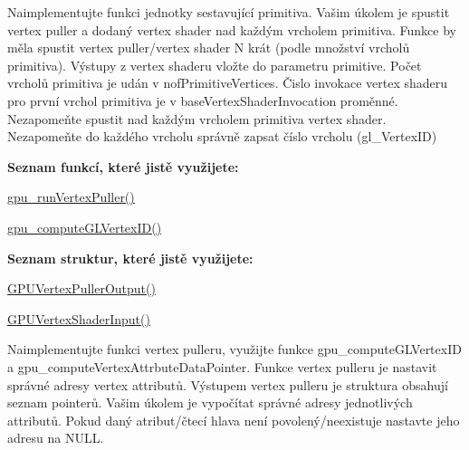 \begin{DoxyRefList}
\item[\label{todo__todo000006}%
\hypertarget{todo__todo000006}{}%
Global \hyperlink{group__gpu__side_ga5eb10381738a5e0426b2811820bc9483}{gpu\-\_\-run\-Primitive\-Assembly} (G\-P\-U const gpu, \hyperlink{structGPUPrimitive}{G\-P\-U\-Primitive} $\ast$const primitive, size\-\_\-t const nof\-Primitive\-Vertices, \hyperlink{structGPUVertexPullerConfiguration}{G\-P\-U\-Vertex\-Puller\-Configuration} const $\ast$const puller, Vertex\-Shader\-Invocation const base\-Vertex\-Shader\-Invocation, Vertex\-Shader const vertex\-Shader)]Naimplementujte funkci jednotky sestavující primitiva. Vašim úkolem je spustit vertex puller a dodaný vertex shader nad každým vrcholem primitiva. Funkce by měla spustit vertex puller/vertex shader N krát (podle množství vrcholů primitiva). Výstupy z vertex shaderu vložte do parametru primitive. Počet vrcholů primitiva je udán v nof\-Primitive\-Vertices. Čislo invokace vertex shaderu pro první vrchol primitiva je v base\-Vertex\-Shader\-Invocation proměnné. Nezapomeňte spustit nad každým vrcholem primitiva vertex shader. Nezapomeňte do každého vrcholu správně zapsat číslo vrcholu (gl\-\_\-\-Vertex\-I\-D)\par
 {\bfseries Seznam funkcí, které jistě využijete\-:}
\begin{DoxyItemize}
\item \hyperlink{group__gpu__side_ga0e0c36548db12eea1e6d512b9f855a1c}{gpu\-\_\-run\-Vertex\-Puller()}
\item \hyperlink{group__gpu__side_ga3983ddd2c559c1a6d1e1f1f37be3eae0}{gpu\-\_\-compute\-G\-L\-Vertex\-I\-D()}\par
 {\bfseries Seznam struktur, které jistě využijete\-:}
\item \hyperlink{fwd_8h_a791f232eebdb273092201dacd9b3fd60}{G\-P\-U\-Vertex\-Puller\-Output()}
\item \hyperlink{fwd_8h_ac6b1d5e207ea5e4a8fc1208c7da10ffa}{G\-P\-U\-Vertex\-Shader\-Input()}  
\end{DoxyItemize}
\item[\label{todo__todo000005}%
\hypertarget{todo__todo000005}{}%
Global \hyperlink{group__gpu__side_ga0e0c36548db12eea1e6d512b9f855a1c}{gpu\-\_\-run\-Vertex\-Puller} (\hyperlink{structGPUVertexPullerOutput}{G\-P\-U\-Vertex\-Puller\-Output} $\ast$const output, \hyperlink{structGPUVertexPullerConfiguration}{G\-P\-U\-Vertex\-Puller\-Configuration} const $\ast$const puller, Vertex\-Shader\-Invocation const vertex\-Shader\-Invocation)]Naimplementujte funkci vertex pulleru, využijte funkce gpu\-\_\-compute\-G\-L\-Vertex\-I\-D a gpu\-\_\-compute\-Vertex\-Attrbute\-Data\-Pointer. Funkce vertex pulleru je nastavit správné adresy vertex attributů. Výstupem vertex pulleru je struktura obsahují seznam pointerů. Vašim úkolem je vypočítat správné adresy jednotlivých attributů. Pokud daný atribut/čtecí hlava není povolený/neexistuje nastavte jeho adresu na N\-U\-L\-L.\par

\end{DoxyRefList}
